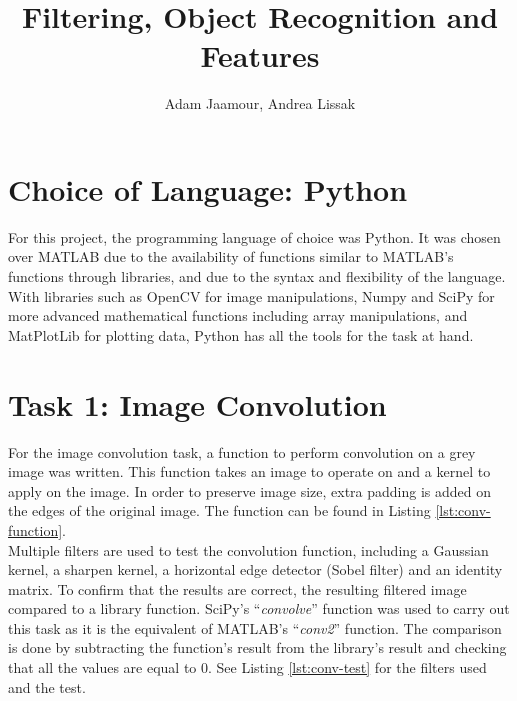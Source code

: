 \documentclass[a4paper,11pt,twocolumn]{article}
\title{Filtering, Object Recognition and Features}
\author{Adam Jaamour, Andrea Lissak}
\begin{document}
\maketitle
\clearpage

\section{Choice of Language: Python}

For this project, the programming language of choice was Python. It was chosen over MATLAB due to the availability of functions similar to MATLAB's functions through libraries, and due to the syntax and flexibility of the language. With libraries such as OpenCV for image manipulations, Numpy and SciPy for more advanced mathematical functions including array manipulations, and MatPlotLib for plotting data, Python has all the tools for the task at hand.


\section{Task 1: Image Convolution}

For the image convolution task, a function to perform convolution on a grey image was written. This function takes an image to operate on and a kernel to apply on the image. In order to preserve image size, extra padding is added on the edges of the original image. The function can be found in Listing \ref{lst:conv-function}.\\

Multiple filters are used to test the convolution function, including a Gaussian kernel, a sharpen kernel, a horizontal edge detector (Sobel filter) and an identity matrix. To confirm that the results are correct, the resulting filtered image compared to a library function. SciPy's ``\textit{convolve}'' function was used to carry out this task as it is the equivalent of MATLAB's ``\textit{conv2}'' function. The comparison is done by subtracting  the function's result from the library's result and checking that all the values are equal to 0. See Listing \ref{lst:conv-test} for the filters used and the test.

\end{document}
